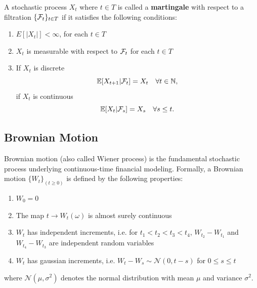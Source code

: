 \begin{definition}[Martingale]
    A stochastic process ${X}_{t}$ where $t \in T$ is called a \textbf{martingale}
    with respect to a filtration $\{\mathcal{F}_t\}_{t \in T}$ if it satisfies the following conditions:
    \begin{enumerate}
        \item $E[|X_t|] < \infty$, for each $t \in T$ 
        \item $X_t$ is measurable with respect to $\mathcal{F}_t$ for each $t \in T$
        \item If $X_t$ is discrete
            \begin{equation*}
                \mathbb{E}[X_{t + 1} | \mathcal{F}_t] = X_t \quad \forall t \in \mathbb{N},
            \end{equation*}
            if $X_t$ is continuous
            \begin{equation*}
                \mathbb{E}[X_t | \mathcal{F}_s] = X_s \quad \forall s \leq t.
            \end{equation*}
    \end{enumerate}
\end{definition}




\subsection{Brownian Motion}

Brownian motion (also called Wiener process) is the fundamental stochastic process underlying continuous-time financial modeling.
Formally, a Brownian motion $\{ W_t \}_{(t \geq 0)}$ is defined by the following properties:

\begin{enumerate}
    \item $W_0 = 0$

    \item The map $t \rightarrow W_t(\omega)$ is almost surely continuous

    \item $W_t$ has independent increments,
        i.e. for $t_1 < t_2 < t_3 < t_4$, $W_{t_2} - W_{t_1}$ and $W_{t_4} - W_{t_3}$ are independent random variables

    \item $W_t$ has gaussian increments,
        i.e. $W_t - W_s \sim \mathcal{N}(0, t-s)$ for $0 \leq s \leq t$
\end{enumerate}
where $\mathcal{N}(\mu, \sigma^2)$ denotes the normal distribution with mean $\mu$ and variance $\sigma^2$.


